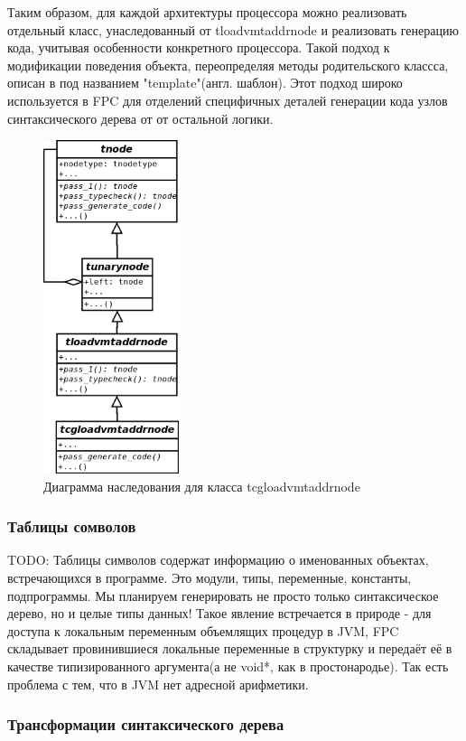 \documentclass{imcs}
\begin{document}
Таким образом, для каждой архитектуры процессора можно реализовать отдельный класс, 
унаследованный от tloadvmtaddrnode и реализовать генерацию кода, 
учитывая особенности конкретного процессора.
Такой подход к модификации поведения объекта, переопределяя методы родительского классса,
описан в \cite{gof} под названием "template"(англ. шаблон). Этот подход широко
используется в FPC для отделений специфичных деталей генерации кода узлов синтаксического
дерева от от остальной логики.

\begin{figure}[htb]
\centering
\includegraphics[width=150px]{./uml/cgnodeexample.png}
\caption{Диаграмма наследования для класса tcgloadvmtaddrnode}
\end{figure}

\subsubsection{Таблицы сомволов}

TODO: Таблицы символов содержат информацию о именованных объектах, встречающихся в 
программе. Это модули, типы, переменные, константы, подпрограммы. Мы планируем
генерировать не просто только синтаксическое дерево, но и целые типы данных! Такое
явление встречается в природе - для доступа к локальным переменным объемлящих процедур
в JVM, FPC складывает провинившиеся локальные переменные в структурку и передаёт её в
качестве типизированного аргумента(а не void*, как в простонародье). Так есть
проблема с тем, что в JVM нет адресной арифметики.

\subsubsection{Трансформации синтаксического дерева}
\end{document}

